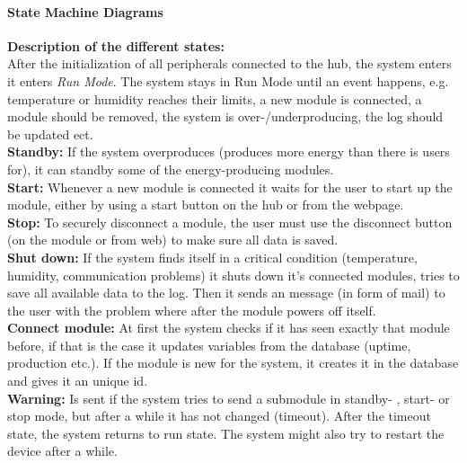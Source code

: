 			\paragraph{State Machine Diagrams}
				\textbf{ }
				\textbf{Description of the different states: }
				\\ After the initialization of all peripherals connected to the hub, the system enters it enters \textit{Run Mode}.
				The system stays in Run Mode until an event happens, e.g. temperature or humidity reaches their limits,
				a new module is connected, a module should be removed, the system is over-/underproducing, the log should be updated ect. 
				\\\textbf{Standby: }If the system overproduces (produces more energy than there is users for), it can standby some of the energy-producing modules.
				\\\textbf{Start: }Whenever a new module is connected it waits for the user to start up the module, either by using a start button on the hub or from the webpage.
				\\\textbf{Stop: }To securely disconnect a module, the user must use the disconnect button (on the module or from web) to make sure all data is saved.
				\\\textbf{Shut down: }If the system finds itself in a critical condition (temperature, humidity, communication problems) it shuts down it's connected modules,
							        tries to save all available data to the log. Then it sends an message (in form of mail) to the user with the problem where after the module
							        powers off itself. 
				\\\textbf{Connect module: }At first the system checks if it has seen exactly that module before, if that is the case it updates variables from the database
									(uptime, production etc.). If the module is new for the system, it creates it in the database and gives it an unique id.
				\\\textbf{Warning: }Is sent if the system tries to send a submodule in standby- , start- or stop mode, but after a while it has not changed (timeout). 
							    After the timeout state, the system returns to run state. The system might also try to restart the device after a while.
			\newpage
